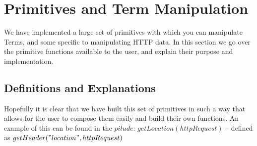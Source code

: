 \section{Primitives and Term Manipulation}

We have implemented a large set of primitives with which you can manipulate Terms, and some specific to manipulating HTTP data. In this section we go over the primitive functions available to the user, and explain their purpose and implementation.
 
\subsection{Definitions and Explanations}



Hopefully it is clear that we have built this set of primitives in such a way that allows for the user to compose them easily and build their own functions. An example of this can be found in the $pilude$: $getLocation(httpRequest)$ -- defined as $getHeader("location",httpRequest)$
